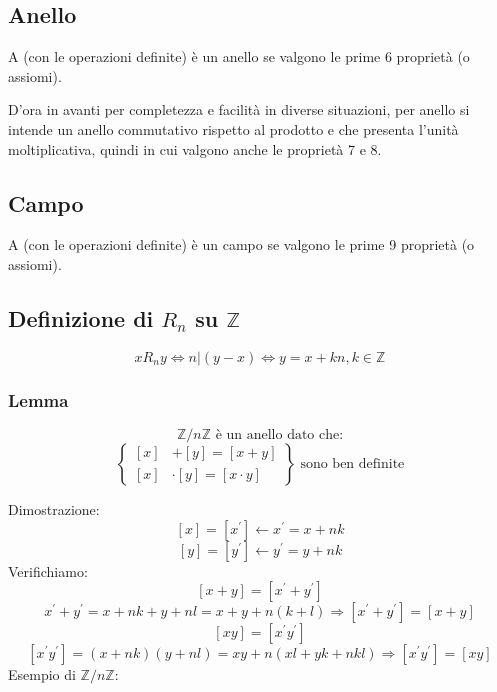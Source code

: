 \documentclass[a4paper,12pt]{article}
\newcommand{\rel}[1][R]{R}
\begin{document}
	\subsection{Anello}
	A (con le operazioni definite) è un anello se valgono le prime 6 proprietà (o assiomi).
	
	D'ora in avanti per completezza e facilità in diverse situazioni, per anello si intende un anello commutativo rispetto al prodotto e che presenta l'unità moltiplicativa, quindi in cui valgono anche le proprietà 7 e 8.
	
	\subsection{Campo}
	A (con le operazioni definite) è un campo se valgono le prime 9 proprietà (o assiomi).
	
	\subsection{Definizione di $\rel_n$ su $\mathbb{Z}$}
	\[x \rel_n y \iff n | (y - x) \iff y = x + kn, k\in \mathbb{Z}\]
	
	\subsubsection{Lemma}
	\[\mathbb{Z}/n\mathbb{Z} \text{ è un anello dato che:}\]
	\[\left\{\begin{aligned}
		[x] &+ [y] = [x + y] \\
		[x] &\cdot [y] = [x \cdot y]
	\end{aligned}\right\} \text{ sono ben definite}\]
	
	Dimostrazione:
	\[[x] = [x^\prime] \leftarrow x^\prime = x + nk\]
	\[[y] = [y^\prime] \leftarrow y^\prime = y + nk\]
	Verifichiamo:
	\[[x + y] = [x^\prime + y^\prime]\]
	\[x^\prime + y^\prime = x +nk + y + nl = x + y +n(k + l) \Rightarrow [x^\prime + y^\prime] = [x + y]\]
	\[[xy] = [x^\prime y^\prime]\]
	\[[x^\prime y^\prime] = (x +nk)(y + nl) = xy + n(xl + yk + nkl) \Rightarrow [x^\prime y^\prime] = [xy]\]
	Esempio di $\mathbb{Z}/n\mathbb{Z}$:
	
\end{document}
